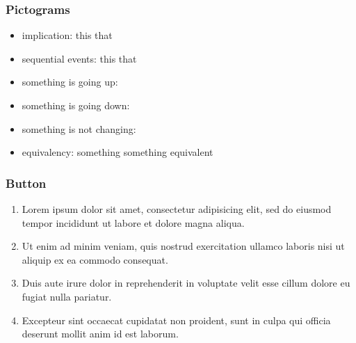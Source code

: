 \documentclass[11pt,xcolor={dvipsnames},hyperref={pdftex,pdfpagemode=UseNone,hidelinks,pdfdisplaydoctitle=true},usepdftitle=false]{beamer}
\begin{document}
\begin{frame}
\end{frame}

\begin{frame}
\frametitle{Pictograms}
\begin{itemize}
\item implication: this \so that
\item sequential events: this \then that
\item something is going up: \up
\item something is going down: \down
\item something is not changing: \flat 
\item equivalency: something \iff something equivalent 
\end{itemize}
\end{frame}

\begin{frame}[label=firstSlide]
\frametitle{Button}
\begin{enumerate}
\item Lorem ipsum dolor sit amet, consectetur adipisicing elit, sed do eiusmod
tempor incididunt ut labore et dolore magna aliqua.
\item  Ut enim ad minim veniam, quis nostrud exercitation ullamco laboris nisi ut aliquip ex ea commodo consequat. 
\item Duis aute irure dolor in reprehenderit in voluptate velit esse
cillum dolore eu fugiat nulla pariatur. 
\item Excepteur sint occaecat cupidatat non proident, sunt in culpa qui officia deserunt mollit anim id est laborum.
\end{enumerate}
\hyperlink{backupSlide}{}
\hyperlink{anotherBackupSlide}{}
\end{frame}
\end{document}
